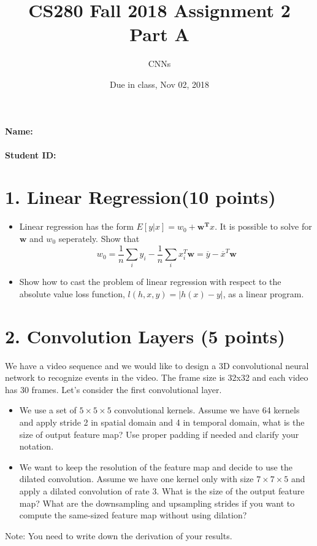 \documentclass[12pt]{article}%
\begin{document}
\title{CS280 Fall 2018 Assignment 2 \\ Part A}
\author{CNNs}
\date{Due in class, Nov 02, 2018}
\maketitle

\paragraph{Name:}

\paragraph{Student ID:}

\newpage

\section*{1. Linear Regression(10 points)}
\begin{itemize}
	\item Linear regression has the form $E[y\lvert x] = w_{0} + \bm{w^{T}}x$. It is possible to solve for $\bm{w}$ and $w_{0}$ seperately. Show that
	\begin{equation*}
	w_{0} = \frac{1}{n}\sum_{i}y_{i} - \frac{1}{n}\sum_{i}x_{i}^{T}\bm{w} = \overline{y} - \overline{x}^{T}\bm{w} 
	\end{equation*}
	
	
	\item Show how to cast the problem of linear regression with respect to the absolute value loss function, $l(h,x,y)=\lvert h(x) - y \rvert$, as a linear program.
\end{itemize}

\section*{2. Convolution Layers (5 points)}
We have a video sequence and we would like to design a 3D convolutional neural network to recognize events in the video. The frame size is 32x32 and each video has 30 frames. Let's consider the first convolutional layer.  
\begin{itemize}
	\item We use a set of $5\times 5\times 5$ convolutional kernels. Assume we have 64 kernels and apply stride 2 in spatial domain and 4 in temporal domain, what is the size of output feature map? Use proper padding if needed and clarify your notation.
	\item We want to keep the resolution of the feature map and decide to use the dilated convolution. Assume we have one kernel only with size $7\times 7\times 5$ and apply a dilated convolution of rate $3$. What is the size of the output feature map? What are the downsampling and upsampling strides if you want to compute the same-sized feature map without using dilation?   
\end{itemize}
Note: You need to write down the derivation of your results.
\newpage
\end{document}
